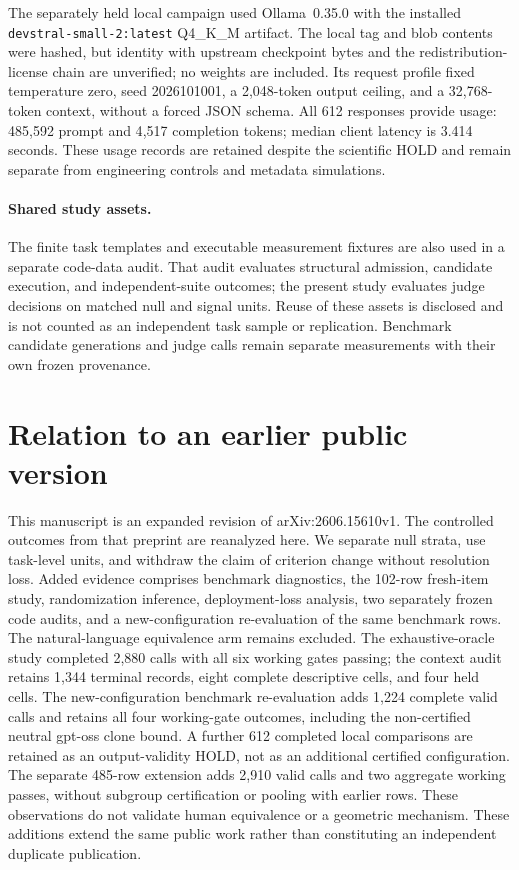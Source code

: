 \documentclass[10pt]{article}
\begin{document}
The separately held local campaign used Ollama~0.35.0 with the installed \texttt{devstral-small-2:\allowbreak latest} Q4\_K\_M artifact. The local tag and blob contents were hashed, but identity with upstream checkpoint bytes and the redistribution-license chain are unverified; no weights are included. Its request profile fixed temperature zero, seed 2026101001, a 2,048-token output ceiling, and a 32,768-token context, without a forced JSON schema. All 612 responses provide usage: 485{,}592 prompt and 4{,}517 completion tokens; median client latency is 3.414 seconds. These usage records are retained despite the scientific HOLD and remain separate from engineering controls and metadata simulations.

\paragraph{Shared study assets.}
The finite task templates and executable measurement fixtures are also used in a separate code-data audit. That audit evaluates structural admission, candidate execution, and independent-suite outcomes; the present study evaluates judge decisions on matched null and signal units. Reuse of these assets is disclosed and is not counted as an independent task sample or replication. Benchmark candidate generations and judge calls remain separate measurements with their own frozen provenance.

\section{Relation to an earlier public version}

This manuscript is an expanded revision of arXiv:2606.15610v1. The controlled outcomes from that preprint are reanalyzed here. We separate null strata, use task-level units, and withdraw the claim of criterion change without resolution loss. Added evidence comprises benchmark diagnostics, the 102-row fresh-item study, randomization inference, deployment-loss analysis, two separately frozen code audits, and a new-configuration re-evaluation of the same benchmark rows. The natural-language equivalence arm remains excluded. The exhaustive-oracle study completed 2,880 calls with all six working gates passing; the context audit retains 1,344 terminal records, eight complete descriptive cells, and four held cells. The new-configuration benchmark re-evaluation adds 1,224 complete valid calls and retains all four working-gate outcomes, including the non-certified neutral gpt-oss clone bound. A further 612 completed local comparisons are retained as an output-validity HOLD, not as an additional certified configuration. The separate 485-row extension adds 2,910 valid calls and two aggregate working passes, without subgroup certification or pooling with earlier rows. These observations do not validate human equivalence or a geometric mechanism. These additions extend the same public work rather than constituting an independent duplicate publication.
\end{document}
